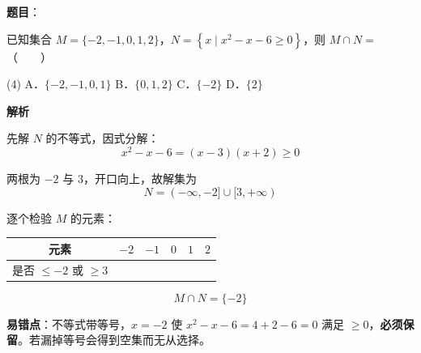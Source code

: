 \begin{answer}

\textbf{题目}：

已知集合 $M=\{-2,-1,0,1,2\}$，$N=\left\{x\mid x^{2}-x-6\ge0\right\}$，则 $M\cap N=$\mbox{（　　）}

\begin{gkopts}(4)
\task A．$\{-2,-1,0,1\}$
\task B．$\{0,1,2\}$
\task C．$\{-2\}$
\task D．$\{2\}$
\end{gkopts}

\textbf{解析}

先解 $N$ 的不等式，因式分解：
\nopagebreak[4]
\[x^{2}-x-6=(x-3)(x+2)\ge0\]

两根为 $-2$ 与 $3$，开口向上，故解集为
\nopagebreak[4]
\[N=(-\infty,-2]\cup[3,+\infty)\]

逐个检验 $M$ 的元素：

\begin{center}
\begin{tabular}{cccccc}
\toprule
元素 & $-2$ & $-1$ & $0$ & $1$ & $2$ \\
\midrule
是否 $\le-2$ 或 $\ge3$ &  &  &  &  &  \\
\bottomrule
\end{tabular}
\end{center}

\nopagebreak[4]
\[M\cap N=\{-2\}\]

\begin{gktip}
\textbf{易错点}：不等式带等号，$x=-2$ 使 $x^2-x-6=4+2-6=0$ 满足 $\ge0$，\textbf{必须保留}。若漏掉等号会得到空集而无从选择。
\end{gktip}


\par\medskip

\end{answer}

